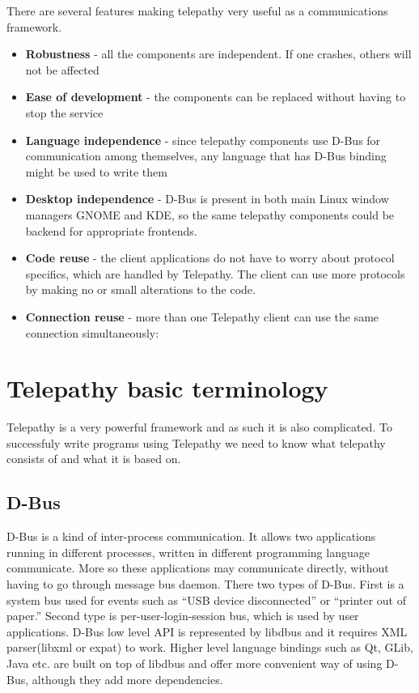 There are several features making telepathy very useful as a communications framework.

\begin{itemize}

	\item {\bf Robustness} - all the components are independent. If one crashes, others will not be affected

	\item {\bf Ease of development} - the components can be replaced without having to stop the service 

	\item {\bf Language independence} - since telepathy components use D-Bus for communication among themselves, any language that has D-Bus binding might be used to write them

	\item {\bf Desktop independence} - D-Bus is present in both main Linux window managers GNOME and KDE, so the same telepathy components could be backend for appropriate frontends.

	\item {\bf Code reuse} - the client applications do not have to worry about protocol specifics, which are handled by Telepathy. The client can use more protocols by making no or small alterations to the code.

	\item {\bf Connection reuse} - more than one Telepathy client can use the same connection simultaneously:
\end{itemize}

\section{Telepathy basic terminology}
Telepathy is a very powerful framework and as such it is also complicated. To successfuly write programs using Telepathy we need to know what telepathy consists of and what it is based on. 

\subsection*{D-Bus}
D-Bus is a kind of inter-process communication. It allows two applications running in different processes, written in different programming language communicate. More so these applications may communicate directly, without having to go through message bus daemon. There two types of D-Bus. First is a system bus used for events such as ``USB device disconnected'' or ``printer out of paper.'' Second type is per-user-login-session bus, which is used by user applications. D-Bus low level API is represented by libdbus and it requires XML parser(libxml or expat) to work. Higher level language bindings such as Qt, GLib, Java etc. are built on top of libdbus and offer more convenient way of using D-Bus, although they add more dependencies.\cite{dbus}\cite{TPWiki} 


